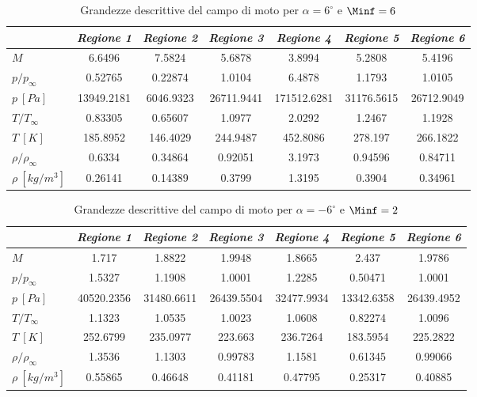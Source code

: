 \begin{table} [H]
	\centering 
	\begin{tabular}{l  c  c c c c c}    
		\toprule&
		\emph{Regione 1}& \emph{Regione 2}& \emph{Regione 3}& \emph{Regione 4}& \emph{Regione 5}& \emph{Regione 6}   \\  \midrule$M$ &6.6496 &7.5824 &5.6878 &3.8994 &5.2808 &5.4196 \\
		$p/p_{\infty}$ &0.52765 &0.22874 &1.0104 &6.4878 &1.1793 &1.0105 \\
		$p \ [\si{Pa}]$ &13949.2181 &6046.9323 &26711.9441 &171512.6281 &31176.5615 &26712.9049 \\
		$T/T_{\infty}$ &0.83305&0.65607&1.0977&2.0292&1.2467&1.1928\\
		$T \ [K]$ &185.8952&146.4029&244.9487&452.8086&278.197&266.1822\\
		$\rho/\rho_{\infty}$ &0.6334&0.34864&0.92051&3.1973&0.94596&0.84711\\
		$\rho \ [kg/m^3]$ &0.26141&0.14389&0.3799&1.3195&0.3904&0.34961\\
		\bottomrule
	\end{tabular}
	\caption {\footnotesize Grandezze descrittive del campo di moto per $\alpha=6^\circ$ e $\Minf=6$}\label{tabS8}
\end{table}	


\begin{table} [H]
	\centering 
	\begin{tabular}{l  c  c c c c c}    
		\toprule&   
		\emph{Regione 1}& \emph{Regione 2}& \emph{Regione 3}& \emph{Regione 4}& \emph{Regione 5}& \emph{Regione 6}   \\  \midrule$M$ &1.717 &1.8822 &1.9948 &1.8665 &2.437 &1.9786 \\
		$p/p_{\infty}$ &1.5327 &1.1908 &1.0001 &1.2285 &0.50471 &1.0001 \\
		$p \ [\si{Pa}]$ &40520.2356 &31480.6611 &26439.5504 &32477.9934 &13342.6358 &26439.4952 \\
		$T/T_{\infty}$ &1.1323&1.0535&1.0023&1.0608&0.82274&1.0096\\
		$T \ [K]$ &252.6799&235.0977&223.663&236.7264&183.5954&225.2822\\
		$\rho/\rho_{\infty}$ &1.3536&1.1303&0.99783&1.1581&0.61345&0.99066\\
		$\rho \ [kg/m^3]$ &0.55865&0.46648&0.41181&0.47795&0.25317&0.40885\\
		\bottomrule\end{tabular}
	\caption {\footnotesize Grandezze descrittive del campo di moto per $\alpha=-6^\circ$ e $\Minf=2$}\label{tabS9}
\end{table}			

